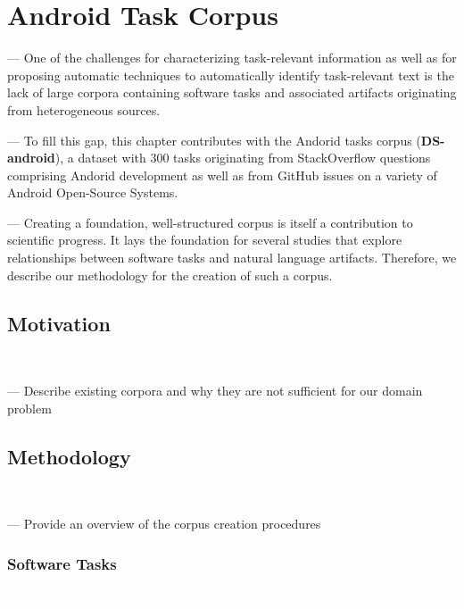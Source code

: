 \setcounter{chapter}{3}
\setcounter{rq}{1}


\chapter{Android Task Corpus}
\label{ch:identifying}



\vspace{1mm}

--- One of the challenges for characterizing task-relevant information as well as for proposing automatic techniques to automatically identify task-relevant text is 
the lack of large corpora containing 
software tasks and associated artifacts originating from heterogeneous sources.


--- To fill this gap, this chapter contributes with the Andorid tasks corpus (\textbf{\acs{DS-android}}), a dataset with 300 tasks originating from StackOverflow questions comprising Andorid development
as well as from GitHub issues on a variety of Android Open-Source Systems. 



--- Creating a foundation, well-structured corpus is itself a contribution to scientific progress. It lays the foundation 
for several studies that explore relationships between software tasks and natural language artifacts. Therefore, we describe our methodology for the creation of such a corpus.


\section{Motivation}
\textcolor{white}{force ident} %

--- Describe existing corpora and why they are not sufficient for our domain problem

\clearpage

\section{Methodology}
\textcolor{white}{force ident} %

--- Provide an overview of the corpus creation procedures 


\subsection{Software Tasks}
\textcolor{white}{force ident} %

